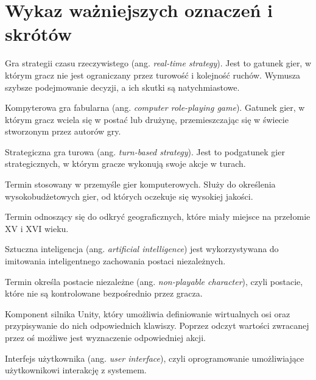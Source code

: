 \chapter*{Wykaz ważniejszych oznaczeń i skrótów}
\begin{description}[style=multiline,leftmargin=3cm]
\item[RTS] Gra strategii czasu rzeczywistego (ang. \textit{real-time strategy}). Jest to gatunek gier, w którym gracz nie jest
ograniczany przez turowość i kolejność ruchów. Wymusza szybsze podejmowanie decyzji, a ich skutki są natychmiastowe.
\item[cRPG] Kompyterowa gra fabularna (ang. \textit{computer role-playing game}). Gatunek gier, w którym gracz wciela
się w postać lub drużynę, przemieszczając się w świecie stworzonym przez autorów gry.
\item[TBS] Strategiczna gra turowa (ang. \textit{turn-based strategy}). Jest to podgatunek gier strategicznych, w którym
gracze wykonują swoje akcje w turach.
\item[AAA (Triple-A)] Termin stosowany w przemyśle gier komputerowych. Służy do określenia wysokobudżetowych gier, od
których oczekuje się wysokiej jakości.
\item[Wielkie odkrycia geograficzne] Termin odnoszący się do odkryć geograficznych, które miały miejsce na przełomie XV
i XVI wieku.
\item[AI] Sztuczna inteligencja (ang. \textit{artificial intelligence}) jest wykorzystywana do imitowania inteligentnego
zachowania postaci niezależnych.
\item[NPC] Termin określa postacie niezależne (ang. \textit{non-playable character}), czyli postacie, które nie są kontrolowane bezpośrednio
przez gracza.
\item[Input Manager] Komponent silnika Unity, który umożliwia definiowanie wirtualnych osi oraz przypisywanie do nich
odpowiednich klawiszy. Poprzez odczyt wartości zwracanej przez oś możliwe jest wyznaczenie odpowiedniej akcji.
\item[UI] Interfejs użytkownika (ang. \textit{user interface}), czyli oprogramowanie umożliwiające użytkownikowi
interakcję z systemem.
\end{description}
